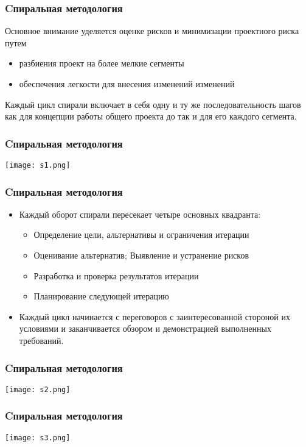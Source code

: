 \documentclass{../industrial-development}
\begin{document}
	
\begin{frame} \frametitle{Cпиральная методология}
Основное внимание уделяется \alert{оценке рисков} и \alert{минимизации проектного риска} путем
\begin{itemize}
		\item разбиения проект на более мелкие сегменты
		\item обеспечения легкости для внесения изменений изменений 
\end{itemize}		
\begin{block}{}
Каждый цикл спирали включает в себя одну и ту же последовательность шагов как для концепции работы общего проекта до так и для его каждого сегмента.
\end{block} 
\end{frame}

\begin{frame} \frametitle{Cпиральная методология}
  \centerline{\texttt{[image: s1.png]}}
\end{frame}

\begin{frame} \frametitle{Cпиральная методология}

  \begin{itemize}
 	\item Каждый оборот спирали пересекает четыре основных квадранта:
	\begin{itemize} 
	\item Определение цели, альтернативы и ограничения итерации 
	\item Оценивание альтернатив; Выявление и устранение рисков
	\item Разработка и проверка результатов итерации
	\item Планирование следующей итерацию
	\end{itemize}
	\item Каждый цикл начинается с переговоров с заинтересованной стороной их условиями и заканчивается обзором и демонстрацией выполненных требований. 
  \end{itemize}
\end{frame}

\begin{frame} \frametitle{Cпиральная методология}
  \centerline{\texttt{[image: s2.png]}}
\end{frame}


\begin{frame} \frametitle{Cпиральная методология}
  \centerline{\texttt{[image: s3.png]}}
\end{frame}
\end{document}
